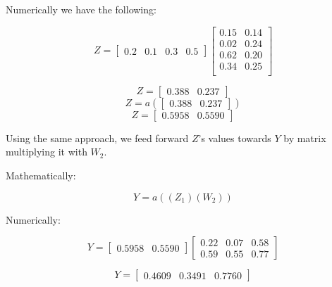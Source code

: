 \documentclass[a4paper]{article}
\begin{document}
Numerically we have the following:

\begin{equation}
  Z=\begin{bmatrix}
      0.2 & 0.1 & 0.3 & 0.5
    \end{bmatrix}
    \begin{bmatrix}
      0.15  & 0.14 \\
      0.02  & 0.24 \\
      0.62  & 0.20 \\
      0.34  & 0.25 \\
    \end{bmatrix}
\end{equation}

\begin{equation}
  Z=\begin{bmatrix}
      0.388 & 0.237
    \end{bmatrix}
\end{equation}
\begin{equation}
  Z=a(\begin{bmatrix}
      0.388 & 0.237
    \end{bmatrix})
\end{equation}
\begin{equation}
  Z=\begin{bmatrix}
      0.5958 & 0.5590
    \end{bmatrix}
\end{equation}

Using the same approach, we feed forward $Z$'s values towards $Y$ by matrix multiplying it with $W_{2}$. 

Mathematically:

\begin{equation}
  Y=a((Z_{1})(W_{2}))
\end{equation}

Numerically:

\begin{equation}
  Y=\begin{bmatrix}
      0.5958 & 0.5590
    \end{bmatrix}
    \begin{bmatrix}
      0.22 & 0.07 & 0.58 \\
      0.59 & 0.55 & 0.77
    \end{bmatrix}
\end{equation}

\begin{equation}
  Y=\begin{bmatrix}
      0.4609 & 0.3491 & 0.7760
    \end{bmatrix}
\end{equation}
\end{document}
